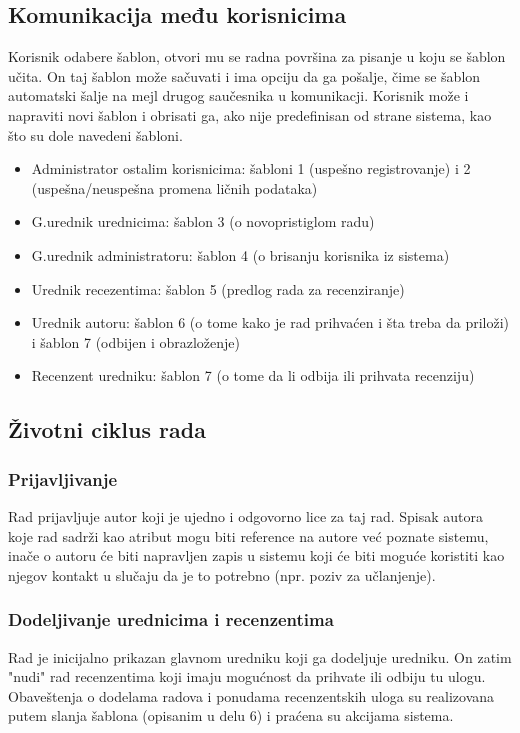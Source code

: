 \documentclass[a4paper]{article}
\begin{document}
\subsection{Komunikacija među korisnicima}
Korisnik odabere šablon, otvori mu se radna površina za pisanje u koju se šablon učita. On taj šablon može sačuvati i ima opciju da ga pošalje, čime se šablon automatski šalje na mejl drugog saučesnika u komunikacji. Korisnik može i napraviti novi šablon i obrisati ga, ako nije predefinisan od strane sistema, kao što su dole navedeni šabloni.
\begin{itemize}
\item Administrator ostalim korisnicima: šabloni 1 (uspešno registrovanje) i 2 (uspešna/neuspešna promena ličnih podataka)
\item G.urednik urednicima: šablon 3 (o novopristiglom radu)
\item G.urednik administratoru: šablon 4 (o brisanju korisnika iz sistema)
\item Urednik recezentima: šablon 5 (predlog rada za recenziranje)
\item Urednik autoru: šablon 6 (o tome kako je rad prihvaćen i šta treba da priloži) i  šablon 7 (odbijen i obrazloženje)
\item Recenzent uredniku: šablon 7 (o tome da li odbija ili prihvata recenziju)
\end{itemize}

\subsection{Životni ciklus rada}
\subsubsection{Prijavljivanje}
Rad prijavljuje autor koji je ujedno i odgovorno lice za taj rad. Spisak autora koje rad sadrži kao atribut mogu biti reference na autore već poznate sistemu, inače o autoru će biti napravljen zapis u sistemu koji će biti moguće koristiti kao njegov kontakt u slučaju da je to potrebno (npr. poziv za učlanjenje).
\subsubsection{Dodeljivanje urednicima i recenzentima}
Rad je inicijalno prikazan glavnom uredniku koji ga dodeljuje uredniku. On zatim "nudi" rad recenzentima koji imaju mogućnost da prihvate ili odbiju tu ulogu. Obaveštenja o dodelama radova i ponudama recenzentskih uloga su realizovana putem slanja šablona (opisanim u delu 6) i praćena su akcijama sistema.
\end{document}
